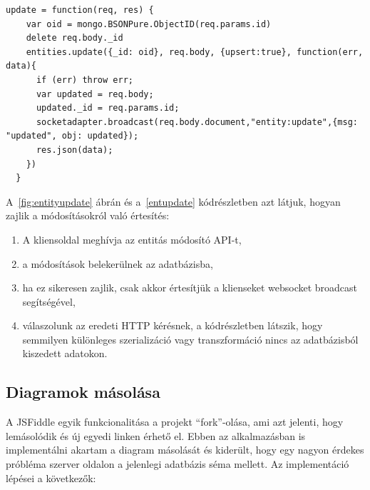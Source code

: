 \begin{lstlisting}[caption=Entitás módosítás feldolgozása szerveroldalon, label=entupdate]
update = function(req, res) {
    var oid = mongo.BSONPure.ObjectID(req.params.id)
    delete req.body._id
    entities.update({_id: oid}, req.body, {upsert:true}, function(err, data){
      if (err) throw err;
      var updated = req.body;
      updated._id = req.params.id;
      socketadapter.broadcast(req.body.document,"entity:update",{msg: "updated", obj: updated});
      res.json(data);
    })
  }
\end{lstlisting}

A~\ref{fig:entityupdate} ábrán és a~\ref{entupdate} kódrészletben azt látjuk, hogyan zajlik a módosításokról való értesítés:

\begin{enumerate}
\item A kliensoldal meghívja az entitás módosító API-t,
\item a módosítások belekerülnek az adatbázisba,
\item ha ez sikeresen zajlik, csak akkor értesítjük a klienseket websocket broadcast segítségével, 
\item válaszolunk az eredeti HTTP kérésnek, a kódrészletben látszik, hogy semmilyen különleges szerializáció vagy transzformáció nincs az adatbázisból kiszedett adatokon.
\end{enumerate}


\subsection{Diagramok másolása}

A JSFiddle egyik funkcionalitása a projekt ``fork''-olása, ami azt jelenti, hogy lemásolódik és új egyedi linken érhető el. Ebben az alkalmazásban is implementálni akartam a diagram másolását és kiderült, hogy egy nagyon érdekes próbléma szerver oldalon a jelenlegi adatbázis séma mellett. Az implementáció lépései a következők:

